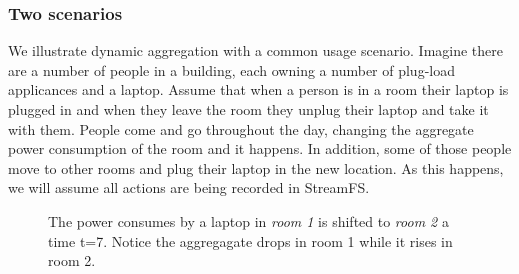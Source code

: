\subsubsection{Two scenarios}
We illustrate dynamic aggregation with a common usage scenario.  Imagine there are a number of people in a building,
each owning a number of plug-load applicances and a laptop.  Assume that when a person is in a room their laptop
is plugged in and when they leave the room they unplug their laptop and take it with them.  People come and go
throughout the day, changing the aggregate power consumption of the room and it happens.  In addition, some
of those people move to other rooms and plug their laptop in the new location.  As this happens, we will assume
all actions are being recorded in StreamFS.

\begin{figure}[htb!]
\begin{center}
\end{center}
\caption{
	The power consumes by a laptop in \emph{room 1} is shifted to \emph{room 2} a time t=7.  Notice the aggregagate drops in room 1
	while it rises in room 2.
     }%
\label{fig:multiroomagg}
\end{figure}

